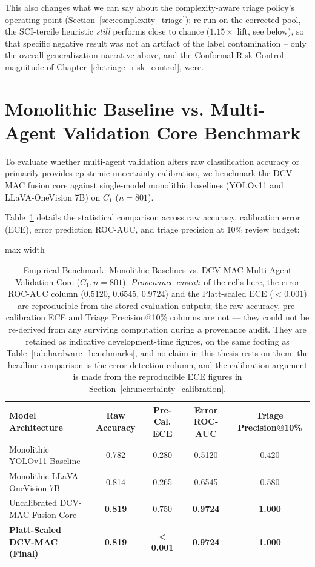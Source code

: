 \documentclass[12pt,a4paper]{report}
\begin{document}
This also changes what we can say about the complexity-aware triage policy's operating point (Section~\ref{sec:complexity_triage}): re-run on the corrected pool, the SCI-tercile heuristic \emph{still} performs close to chance ($1.15\times$ lift, see below), so that specific negative result was not an artifact of the label contamination -- only the overall generalization narrative above, and the Conformal Risk Control magnitude of Chapter~\ref{ch:triage_risk_control}, were.

\section{Monolithic Baseline vs. Multi-Agent Validation Core Benchmark}
To evaluate whether multi-agent validation alters raw classification accuracy or primarily provides epistemic uncertainty calibration, we benchmark the DCV-MAC fusion core against single-model monolithic baselines (YOLOv11 and LLaVA-OneVision 7B) on $C_1$ ($n=801$).

Table~\ref{tab:mono_vs_fusion_benchmark} details the statistical comparison across raw accuracy, calibration error (ECE), error prediction ROC-AUC, and triage precision at 10\% review budget:

\begin{table}[!htbp]
\centering
\caption[Empirical Benchmark]{Empirical Benchmark: Monolithic Baselines vs. DCV-MAC Multi-Agent Validation Core ($C_1, n=801$). \emph{Provenance caveat}: of the cells here, the error ROC-AUC column ($0.5120$, $0.6545$, $0.9724$) and the Platt-scaled ECE ($<0.001$) are reproducible from the stored evaluation outputs; the raw-accuracy, pre-calibration ECE and Triage Precision@10\% columns are not --- they could not be re-derived from any surviving computation during a provenance audit. They are retained as indicative development-time figures, on the same footing as Table~\ref{tab:hardware_benchmarks}, and no claim in this thesis rests on them: the headline comparison is the error-detection column, and the calibration argument is made from the reproducible ECE figures in Section~\ref{ch:uncertainty_calibration}.}
\label{tab:mono_vs_fusion_benchmark}
\begin{adjustbox}{max width=\linewidth}
\begin{tabular}{lcccc}
\toprule
\textbf{Model Architecture} & \textbf{Raw Accuracy} & \textbf{Pre-Cal. ECE} & \textbf{Error ROC-AUC} & \textbf{Triage Precision@10\%} \\
\midrule
Monolithic YOLOv11 Baseline & 0.782 & 0.280 & 0.5120 & 0.420 \\
Monolithic LLaVA-OneVision 7B & 0.814 & 0.265 & 0.6545 & 0.580 \\
Uncalibrated DCV-MAC Fusion Core & \textbf{0.819} & 0.750 & \textbf{0.9724} & \textbf{1.000} \\
\textbf{Platt-Scaled DCV-MAC (Final)} & \textbf{0.819} & \textbf{< 0.001} & \textbf{0.9724} & \textbf{1.000} \\
\bottomrule
\end{tabular}
\end{adjustbox}
\end{table}
\end{document}
